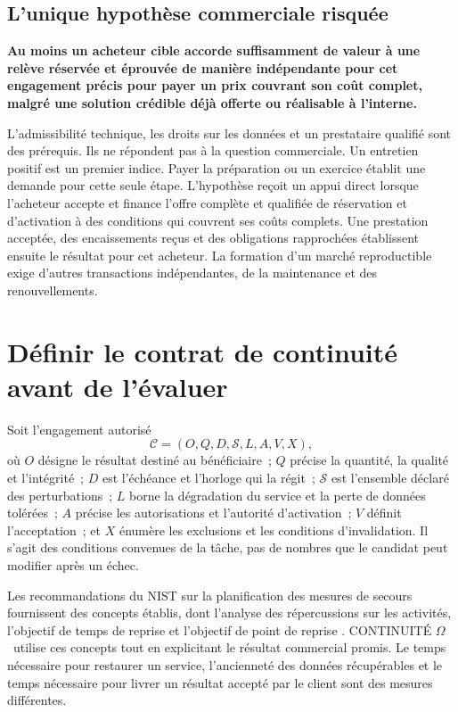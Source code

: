 \documentclass[11pt,a4paper]{article}
\newcommand{\om}{CONTINUITÉ $\Omega$}
\begin{document}
\subsection{L’unique hypothèse commerciale risquée}
\begin{insight}
\textbf{Au moins un acheteur cible accorde suffisamment de valeur à une relève réservée et éprouvée de manière indépendante pour cet engagement précis pour payer un prix couvrant son coût complet, malgré une solution crédible déjà offerte ou réalisable à l’interne.}
\end{insight}
L’admissibilité technique, les droits sur les données et un prestataire qualifié sont des prérequis. Ils ne répondent pas à la question commerciale. Un entretien positif est un premier indice. Payer la préparation ou un exercice établit une demande pour cette seule étape. L’hypothèse reçoit un appui direct lorsque l’acheteur accepte et finance l’offre complète et qualifiée de réservation et d’activation à des conditions qui couvrent ses coûts complets. Une prestation acceptée, des encaissements reçus et des obligations rapprochées établissent ensuite le résultat pour cet acheteur. La formation d’un marché reproductible exige d’autres transactions indépendantes, de la maintenance et des renouvellements.

\section{Définir le contrat de continuité avant de l’évaluer}\label{sec:contract}
Soit l’engagement autorisé
\begin{equation}
\mathcal C=(O,Q,D,\mathcal S,L,A,V,X),
\end{equation}
où $O$ désigne le résultat destiné au bénéficiaire~; $Q$ précise la quantité, la qualité et l’intégrité~; $D$ est l’échéance et l’horloge qui la régit~; $\mathcal S$ est l’ensemble déclaré des perturbations~; $L$ borne la dégradation du service et la perte de données tolérées~; $A$ précise les autorisations et l’autorité d’activation~; $V$ définit l’acceptation~; et $X$ énumère les exclusions et les conditions d’invalidation. Il s’agit des conditions convenues de la tâche, pas de nombres que le candidat peut modifier après un échec.

Les recommandations du NIST sur la planification des mesures de secours fournissent des concepts établis, dont l’analyse des répercussions sur les activités, l’objectif de temps de reprise et l’objectif de point de reprise \cite{nist34}. \om\ utilise ces concepts tout en explicitant le résultat commercial promis. Le temps nécessaire pour restaurer un service, l’ancienneté des données récupérables et le temps nécessaire pour livrer un résultat accepté par le client sont des mesures différentes.
\end{document}
